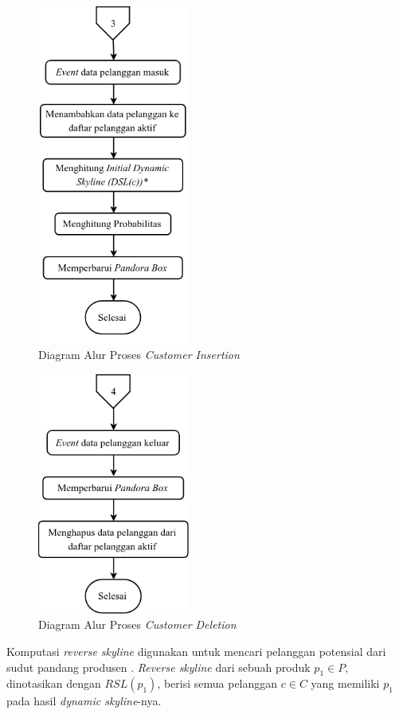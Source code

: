 \begin{figure}[H]
	\centering
	\includegraphics[width=5cm]{assets/img/bab3/flowchart-ci.png}
	\caption{Diagram Alur Proses \textit{Customer Insertion}}
	\label{fig:flowchart-ci}
\end{figure}

\begin{figure}[H]
	\centering
	\includegraphics[width=5cm]{assets/img/bab3/flowchart-co.png}
	\caption{Diagram Alur Proses \textit{Customer Deletion}}
	\label{fig:flowchart-co}
\end{figure}


Komputasi \textit{reverse skyline} digunakan untuk mencari pelanggan potensial dari sudut pandang produsen \cite{kmpp}. \textit{Reverse skyline} \cite{reverse-skyline} dari sebuah produk $p_1 \in
P$, dinotasikan dengan $RSL(p_1)$, berisi semua pelanggan $c \in C$ yang memiliki $p_1$ pada hasil \textit{dynamic skyline}-nya.

